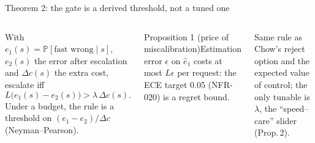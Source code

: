 \documentclass[aspectratio=169,10pt]{beamer}
\renewcommand{\Pr}{\mathbb{P}}
\begin{document}
\begin{frame}{Theorem 2: the gate is a derived threshold, not a tuned one}
\begin{columns}[T]
\begin{theorem}
With $e_1(s)=\Pr[\text{fast wrong}\mid s]$, $e_2(s)$ the error after escalation and $\Delta c(s)$ the extra cost, escalate iff
$$L\big(e_1(s)-e_2(s)\big)>\lambda\,\Delta c(s).$$
Under a budget, the rule is a threshold on $(e_1-e_2)/\Delta c$ (Neyman--Pearson).
\end{theorem}
\begin{block}{Proposition 1 (price of miscalibration)}Estimation error $\epsilon$ on $\hat e_1$ costs at most $L\epsilon$ per request: the ECE target 0.05 (NFR-020) is a regret bound.\end{block}
\scriptsize Same rule as Chow's reject option and the expected value of control; the only tunable is $\lambda$, the ``speed--care'' slider (Prop.\,2).
\end{columns}
\end{frame}
\end{document}
